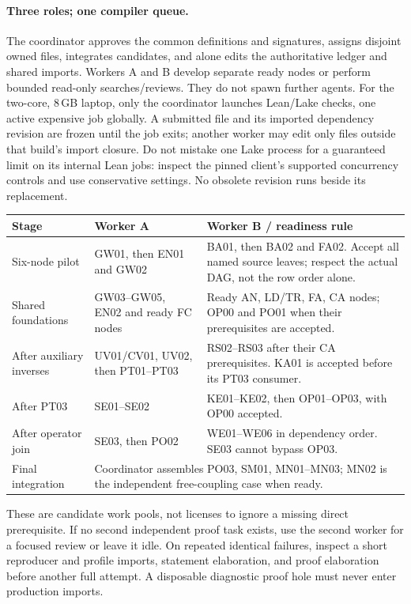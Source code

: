 \documentclass[11pt,a4paper]{article}
\theoremstyle{remark}\newtheorem{remark}[theorem]{Remark}
\begin{document}
\paragraph{Three roles; one compiler queue.}
The coordinator approves the common definitions and signatures, assigns disjoint owned files, integrates candidates, and alone edits the authoritative ledger and shared imports. Workers A and B develop separate ready nodes or perform bounded read-only searches/reviews. They do not spawn further agents. For the two-core, 8\,GB laptop, only the coordinator launches Lean/Lake checks, one active expensive job globally. A submitted file and its imported dependency revision are frozen until the job exits; another worker may edit only files outside that build's import closure. Do not mistake one Lake process for a guaranteed limit on its internal Lean jobs: inspect the pinned client's supported concurrency controls and use conservative settings. No obsolete revision runs beside its replacement.

\begin{longtable}{p{}p{}p{}}
\toprule Stage & Worker A & Worker B / readiness rule\\\midrule\endhead
Six-node pilot & GW01, then EN01 and GW02 & BA01, then BA02 and FA02. Accept all named source leaves; respect the actual DAG, not the row order alone.\\
Shared foundations & GW03--GW05, EN02 and ready FC nodes & Ready AN, LD/TR, FA, CA nodes; OP00 and PO01 when their prerequisites are accepted.\\
After auxiliary inverses & UV01/CV01, UV02, then PT01--PT03 & RS02--RS03 after their CA prerequisites. KA01 is accepted before its PT03 consumer.\\
After PT03 & SE01--SE02 & KE01--KE02, then OP01--OP03, with OP00 accepted.\\
After operator join & SE03, then PO02 & WE01--WE06 in dependency order. SE03 cannot bypass OP03.\\
Final integration & \multicolumn{2}{p{.70\textwidth}}{Coordinator assembles PO03, SM01, MN01--MN03; MN02 is the independent free-coupling case when ready.}\\
\bottomrule
\end{longtable}
These are candidate work pools, not licenses to ignore a missing direct prerequisite. If no second independent proof task exists, use the second worker for a focused review or leave it idle. On repeated identical failures, inspect a short reproducer and profile imports, statement elaboration, and proof elaboration before another full attempt. A disposable diagnostic proof hole must never enter production imports.
\end{document}
